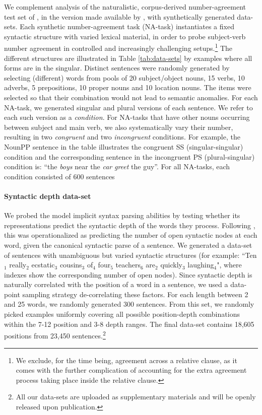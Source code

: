 We complement analysis of the naturalistic, corpus-derived
number-agreement test set of , in the
version made available by , with
synthetically generated data-sets. Each synthetic number-agreement
task (NA-task) instantiates a fixed syntactic structure with varied
lexical material, in order to probe subject-verb number agreement in
controlled and increasingly challenging setups.\footnote{We exclude,
  for the time being, agreement across a relative clause, as it comes
  with the further complication of accounting for the extra agreement
  process taking place inside the relative clause.} The different
structures are illustrated in Table \ref{tab:data-sets} by examples
where all forms are in the singular. Distinct sentences were randomly
generated by selecting (different) words from pools of 20
subject/object nouns, 15 verbs, 10 adverbs, 5 prepositions, 10 proper
nouns and 10 location nouns. The items were selected so that their
combination would not lead to semantic anomalies. For each NA-task, we
generated singular and plural versions of each sentence. We refer to
each such version as a \textit{condition}. For NA-tasks that have
other nouns occurring between subject and main verb, we also
systematically vary their number, resulting in two \textit{congruent}
and two \textit{incongruent} conditions. For example, the NounPP
sentence in the table illustrates the congruent SS (singular-singular)
condition and the corresponding sentence in the incongruent PS
(plural-singular) condition is: ``the \emph{boys} near the \emph{car}
\emph{greet} the guy''. For all NA-tasks, each condition consisted of
600 sentences

\paragraph{Syntactic depth data-set} We probed the model implicit
syntax parsing abilities by testing whether its representations
predict the syntactic depth of the words they process. Following
, this was operationalized as predicting the
number of open syntactic nodes at each word, given the canonical
syntactic parse of a sentence.  We generated a data-set of sentences with
unambiguous but varied syntactic structures (for example:
``Ten$_1$ really$_2$ ecstatic$_3$ cousins$_3$ of$_4$ four$_5$ teachers$_6$
are$_2$ quickly$_3$ laughing$_4$", where indexes show the corresponding
number of open nodes).
Since syntactic depth is
naturally correlated with the position of a word in a sentence, we
used a data-point sampling strategy de-correlating these factors. For
each length between 2 and 25 words, we randomly generated 300
sentences. From this set, we randomly picked examples uniformly
covering all possible position-depth combinations within the 7-12
position and 3-8 depth ranges. The final data-set contains 18,605
positions from 23,450 sentences.\footnote{All our data-sets are
  uploaded as supplementary materials and will be openly released upon
  publication.}